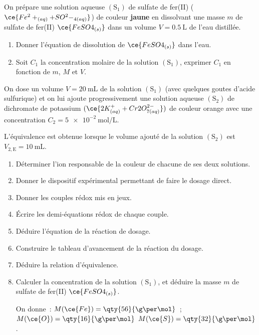 On prépare une solution aqueuse $\mathrm{(S_1)}$ de sulfate de fer(II)
($\ce{Fe^2+_{(aq)} + SO^2-_{4(aq)}}$) de couleur \textbf{jaune} en dissolvant
une masse $m$ de sulfate de fer(II) $\ce{FeSO4_{(s)}}$ dans un volume
$V=\qty{0.5}{\L}$ de l'eau distillée.
\begin{enumerate}
    \item Donner l'équation de dissolution de $\ce{FeSO4_{(s)}}$ dans l'eau.
    \item Soit $C_1$ la concentration molaire de la solution $\mathrm{(S_1)}$,
          exprimer $C_1$ en fonction de $m$, $M$ et $V$.
\end{enumerate}

On dose un volume $V=\qty{20}{\mL}$ de la solution $\mathrm{(S_1)}$ (avec
quelques goutes d'acide sulfurique) et on lui ajoute progressivement une
solution aqueuse $\mathrm{(S_2)}$ de dichromate de potassium
$(\ce{2K^{+}_{(aq)} + Cr2O^{2-}_{7(aq)}})$ de couleur orange avec une
concentration $C_2=\qty{5e-2}{\mol\per\L}$.


L'équivalence est obtenue lorsque le volume ajouté de la solution
$\mathrm{(S_2)}$ est $V_{2,\mathrm{E}}=\qty{10}{\mL}$.
\begin{enumerate}[resume]
    \item Déterminer l'ion responsable de la couleur de chacune de ses deux
          solutions.
    \item Donner le dispositif expérimental permettant de faire le dosage
          direct.
    \item Donner les couples rédox mis en jeux.
    \item Écrire les demi-équations rédox de chaque couple.
    \item Déduire l'équation de la réaction de dosage.
    \item Construire le tableau d'avancement de la réaction du dosage.
    \item Déduire la relation d'équivalence.
    \item Calculer la concentration de la solution $\mathrm{(S_1)}$, et déduire
          la masse $m$ de sulfate de fer(II) $\ce{FeSO4_{(s)}}$.

          On donne~: $M(\ce{Fe})=\qty{56}{\g\per\mol}$~;
          $M(\ce{O})=\qty{16}{\g\per\mol}$
          $M(\ce{S})=\qty{32}{\g\per\mol}$.
\end{enumerate}

